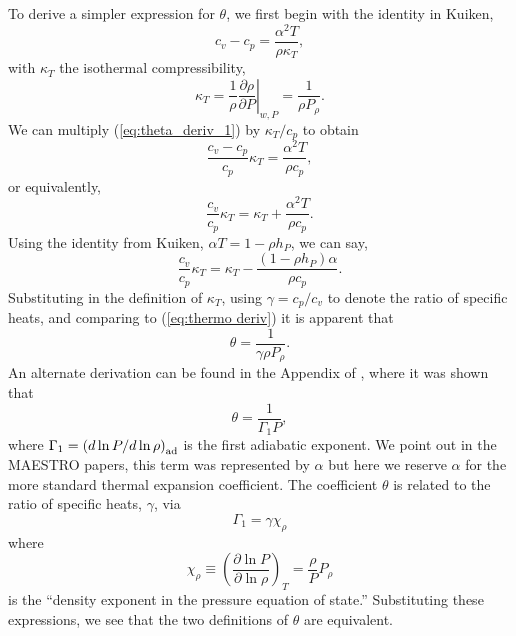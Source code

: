 \documentclass[final]{siamltex}
\begin{document}
To derive a simpler expression for $\theta$, we first begin with the identity
in Kuiken,
\begin{equation}
c_v - c_p = \frac{\alpha^2 T}{\rho \kappa_T},\label{eq:theta_deriv_1}
\end{equation}
with $\kappa_T$ the isothermal compressibility,
\begin{equation}
\kappa_T = \frac{1}{\rho}\left.\frac{\partial\rho}{\partial P}\right|_{w,P} = \frac{1}{\rho P_\rho}.
\end{equation}
We can multiply (\ref{eq:theta_deriv_1}) by $\kappa_T/c_p$ to obtain
\begin{equation}
\frac{c_v - c_p}{c_p}\kappa_T = \frac{\alpha^2 T}{\rho c_p},
\end{equation}
or equivalently,
\begin{equation}
\frac{c_v}{c_p}\kappa_T = \kappa_T + \frac{\alpha^2 T}{\rho c_p}.
\end{equation}
Using the identity from Kuiken, $\alpha T = 1 - \rho h_P$, we can say,
\begin{equation}
\frac{c_v}{c_p}\kappa_T = \kappa_T - \frac{(1-\rho h_P)\alpha}{\rho c_p}.
\end{equation}
Substituting in the definition of $\kappa_T$,
using $\gamma=c_p/c_v$ to denote the ratio of specific heats,
and comparing to (\ref{eq:thermo deriv}) it is apparent that
\begin{equation}
\theta = \frac{1}{\gamma\rho P_\rho}.
\end{equation}
An alternate derivation can be found in the Appendix of \cite{MAESTROI},
where it was shown that
\begin{equation}
\theta = \frac{1}{\Gamma_1 P},
\end{equation}
where $\Gamma_1 = \left(d\ln{P}/d\ln{\rho}\right)_{\rm ad}$ is the first 
adiabatic exponent.  We point out in the MAESTRO papers, this term was represented
by $\alpha$ but here we reserve $\alpha$ for the more standard thermal expansion
coefficient.  The coefficient $\theta$ is related to the ratio of specific heats, 
$\gamma$, via
\begin{equation}
\Gamma_1 = \gamma\chi_\rho
\end{equation}
where
\begin{equation}
\chi_\rho \equiv \left(\frac{\partial\ln{P}}{\partial\ln{\rho}}\right)_T = \frac{\rho}{P}P_\rho
\end{equation}
is the ``density exponent in the pressure equation of state.''  Substituting
these expressions, we see that the two definitions of $\theta$ are equivalent.\\
\end{document}
